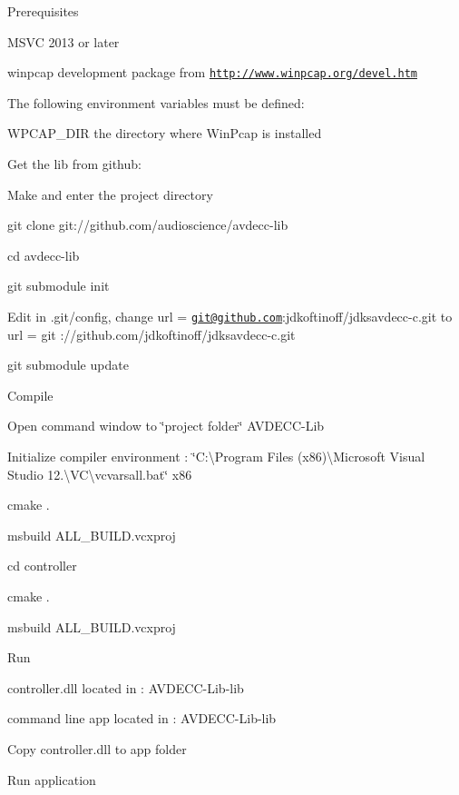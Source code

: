 Prerequisites


\begin{DoxyEnumerate}
\item M\+S\+VC 2013 or later
\item winpcap development package from \href{http://www.winpcap.org/devel.htm}{\tt http\+://www.\+winpcap.\+org/devel.\+htm}
\end{DoxyEnumerate}

The following environment variables must be defined\+:
\begin{DoxyItemize}
\item W\+P\+C\+A\+P\+\_\+\+D\+IR the directory where Win\+Pcap is installed
\end{DoxyItemize}

Get the lib from github\+:
\begin{DoxyItemize}
\item Make and enter the project directory
\item git clone git\+://github.com/audioscience/avdecc-\/lib
\item cd avdecc-\/lib
\item git submodule init
\item Edit in .git/config, change url = \href{mailto:git@github.com}{\tt git@github.\+com}\+:jdkoftinoff/jdksavdecc-\/c.\+git to url = git \+://github.com/jdkoftinoff/jdksavdecc-\/c.\+git
\item git submodule update
\end{DoxyItemize}

Compile
\begin{DoxyItemize}
\item Open command window to \char`\"{}project folder\char`\"{} A\+V\+D\+E\+C\+C-\/\+Lib
\item Initialize compiler environment \+: \char`\"{}\+C\+:\textbackslash{}\+Program Files (x86)\textbackslash{}\+Microsoft Visual Studio 12.\textbackslash{}\+V\+C\textbackslash{}vcvarsall.\+bat\char`\"{} x86
\item cmake .
\item msbuild A\+L\+L\+\_\+\+B\+U\+I\+L\+D.\+vcxproj
\item cd controller
\item cmake .
\item msbuild A\+L\+L\+\_\+\+B\+U\+I\+L\+D.\+vcxproj
\end{DoxyItemize}

Run
\begin{DoxyItemize}
\item controller.\+dll located in \+: A\+V\+D\+E\+C\+C-\/\+Lib-\/lib
\item command line app located in \+: A\+V\+D\+E\+C\+C-\/\+Lib-\/lib
\item Copy controller.\+dll to app folder
\item Run application
\end{DoxyItemize}

